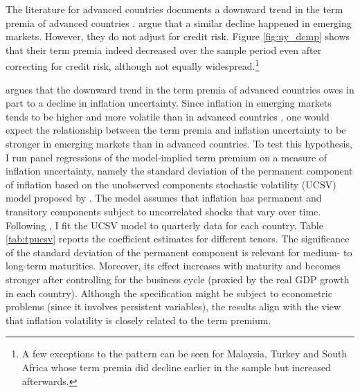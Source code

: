 {The literature for advanced countries documents a downward trend in the term premia of advanced countries \citep{Wright:2011}.
\cite{ACDM:2019} argue that a similar decline happened in emerging markets.
However, they do not adjust for credit risk.
Figure \ref{fig:ny_dcmp} shows that their term premia indeed decreased over the sample period even after correcting for credit risk, although not equally widespread.\footnote{ A few exceptions to the pattern can be seen for Malaysia, Turkey and South Africa whose term premia did decline earlier in the sample but increased afterwards.}

\cite{Wright:2011} argues that the downward trend in the term premia of advanced countries owes in part to a decline in inflation uncertainty.
Since inflation in emerging markets tends to be higher and more volatile than in advanced countries \citep{HaKoseOhnsorge:2019}, one would expect the relationship between the term premia and inflation uncertainty to be stronger in emerging markets than in advanced countries.
To test this hypothesis, I run panel regressions of the model-implied term premium on a measure of inflation uncertainty, namely the standard deviation of the permanent component of inflation based on the unobserved components stochastic volatility (UCSV) model proposed by \cite{StockWatson:2007}. 
The model assumes that inflation has permanent and transitory components subject to uncorrelated shocks that vary over time.
Following \cite{Wright:2011}, I fit the UCSV model to quarterly data for each country.
Table \ref{tab:tpucsv} reports the coefficient estimates for different tenors.
The significance of the standard deviation of the permanent component is relevant for medium- to long-term maturities.
Moreover, its effect increases with maturity and becomes stronger after controlling for the business cycle (proxied by the real GDP growth in each country).
Although the specification might be subject to econometric problems (since it involves persistent variables), the results align with the view that inflation volatility is closely related to the term premium.

}
